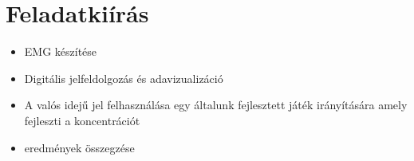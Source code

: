 \section*{Feladatkiírás}

\begin{itemize}
    \item EMG készítése
    \item Digitális jelfeldolgozás és adavizualizáció
    \item A valós idejű jel felhasználása egy általunk fejlesztett játék irányítására amely fejleszti a koncentrációt
    \item eredmények összegzése
\end{itemize}